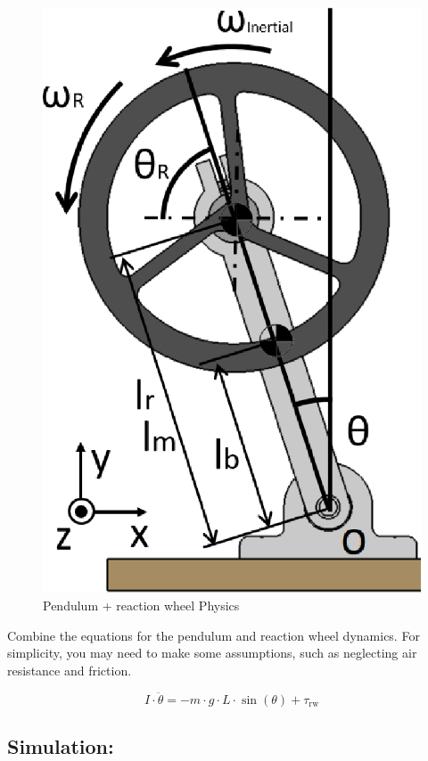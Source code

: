 \documentclass{article}
\begin{document}
\begin{multicols}{2}
\begin{figure}[H]
\centering
\includegraphics[scale=0.195]{inverted pendulum reactionwheel}
\caption{Pendulum + reaction wheel Physics}
\label{fig:Pendulum + reaction wheel Physics}
\end{figure}

Combine the equations for the pendulum and reaction wheel dynamics. For simplicity, you may need to make some assumptions, such as neglecting air resistance and friction.

\[
I \cdot \ddot{\theta} = -m \cdot g \cdot L \cdot \sin(\theta) + \tau_{\text{rw}}
\]

\subsection{Simulation:}


\end{multicols}
\end{document}
